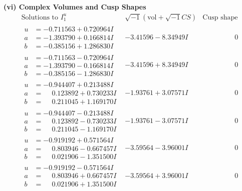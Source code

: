 \documentclass[1p]{elsarticle_modified}
\theoremstyle{definition}
\newcommand{\I}{\sqrt{-1}}
\begin{document}
\newpage\flushleft \textbf{(vi) Complex Volumes and Cusp Shapes}
$$\begin{array}{c|c|c}  
\text{Solutions to }I^u_{1}& \I (\text{vol} + \sqrt{-1}CS) & \text{Cusp shape}\\
 \hline 
\begin{aligned}
u &= -0.711563 + 0.720964 I \\
a &= -1.393790 + 0.166814 I \\
b &= -0.385156 + 1.286830 I\end{aligned}
 & -3.41596 - 8.34949 I & \phantom{-0.000000 } 0 \\ \hline\begin{aligned}
u &= -0.711563 - 0.720964 I \\
a &= -1.393790 - 0.166814 I \\
b &= -0.385156 - 1.286830 I\end{aligned}
 & -3.41596 + 8.34949 I & \phantom{-0.000000 } 0 \\ \hline\begin{aligned}
u &= -0.944407 + 0.213488 I \\
a &= \phantom{-}0.123892 + 0.730233 I \\
b &= \phantom{-}0.211045 + 1.169170 I\end{aligned}
 & -1.93761 + 3.07571 I & \phantom{-0.000000 } 0 \\ \hline\begin{aligned}
u &= -0.944407 - 0.213488 I \\
a &= \phantom{-}0.123892 - 0.730233 I \\
b &= \phantom{-}0.211045 - 1.169170 I\end{aligned}
 & -1.93761 - 3.07571 I & \phantom{-0.000000 } 0 \\ \hline\begin{aligned}
u &= -0.919192 + 0.571564 I \\
a &= \phantom{-}0.803946 - 0.667457 I \\
b &= \phantom{-}0.021906 - 1.351500 I\end{aligned}
 & -3.59564 - 3.96001 I & \phantom{-0.000000 } 0 \\ \hline\begin{aligned}
u &= -0.919192 - 0.571564 I \\
a &= \phantom{-}0.803946 + 0.667457 I \\
b &= \phantom{-}0.021906 + 1.351500 I\end{aligned}
 & -3.59564 + 3.96001 I & \phantom{-0.000000 } 0 \\ \hline\begin{aligned}

\end{aligned}
\end{array}$$
\end{document}
